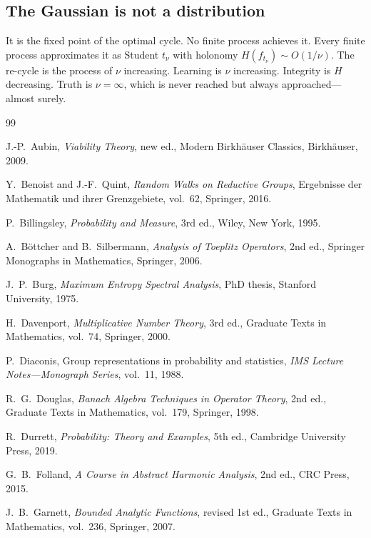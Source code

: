 \documentclass[12pt]{amsart}
\theoremstyle{definition}
\theoremstyle{remark}
\begin{document}
\subsection*{The Gaussian is not a distribution}

It is the fixed point of the optimal cycle. No finite process achieves it. Every finite process approximates it as Student $t_\nu$ with holonomy $H(f_{t_\nu}) \sim O(1/\nu)$. The re-cycle is the process of $\nu$ increasing. Learning is $\nu$ increasing. Integrity is $H$ decreasing. Truth is $\nu = \infty$, which is never reached but always approached---almost surely.

\begin{thebibliography}{99}

J.-P.~Aubin,
\emph{Viability Theory}, new ed.,
Modern Birkh\"auser Classics, Birkh\"auser, 2009.

Y.~Benoist and J.-F.~Quint,
\emph{Random Walks on Reductive Groups},
Ergebnisse der Mathematik und ihrer Grenzgebiete, vol.~62, Springer, 2016.

P.~Billingsley,
\emph{Probability and Measure}, 3rd ed.,
Wiley, New York, 1995.

A.~B\"ottcher and B.~Silbermann,
\emph{Analysis of Toeplitz Operators}, 2nd ed.,
Springer Monographs in Mathematics, Springer, 2006.

J.~P.~Burg,
\emph{Maximum Entropy Spectral Analysis},
PhD thesis, Stanford University, 1975.

H.~Davenport,
\emph{Multiplicative Number Theory}, 3rd ed.,
Graduate Texts in Mathematics, vol.~74, Springer, 2000.

P.~Diaconis,
Group representations in probability and statistics,
\emph{IMS Lecture Notes---Monograph Series}, vol.~11, 1988.

R.~G.~Douglas,
\emph{Banach Algebra Techniques in Operator Theory}, 2nd ed.,
Graduate Texts in Mathematics, vol.~179, Springer, 1998.

R.~Durrett,
\emph{Probability: Theory and Examples}, 5th ed.,
Cambridge University Press, 2019.

G.~B.~Folland,
\emph{A Course in Abstract Harmonic Analysis}, 2nd ed.,
CRC Press, 2015.

J.~B.~Garnett,
\emph{Bounded Analytic Functions}, revised 1st ed.,
Graduate Texts in Mathematics, vol.~236, Springer, 2007.


\end{thebibliography}
\end{document}
